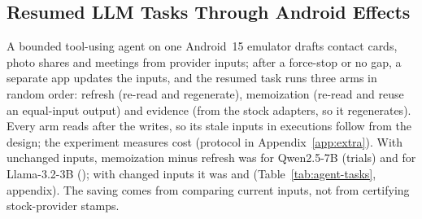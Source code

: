 
\subsection{Resumed LLM Tasks Through Android Effects}
\label{sec:agent-tasks}
A bounded tool-using agent on one Android~15 emulator drafts contact cards, photo shares and meetings from provider inputs; after a force-stop or no gap, a separate app updates the inputs, and the resumed task runs three arms in random order: refresh (re-read and regenerate), memoization (re-read and reuse an equal-input output) and evidence (\Unknown from the stock adapters, so it regenerates). Every arm reads after the writes, so its \TaskStaleK stale inputs in \TaskArmN executions follow from the design; the experiment measures cost (protocol in Appendix~\ref{app:extra}). With unchanged inputs, memoization minus refresh was \TaskPairMemoUnchQwen for Qwen2.5-7B (\TaskPairNUnchQwen trials) and \TaskPairMemoUnchLlama for Llama-3.2-3B (\TaskPairNUnchLlama); with changed inputs it was \TaskPairMemoChgQwen and \TaskPairMemoChgLlama (Table~\ref{tab:agent-tasks}, appendix). The saving comes from comparing current inputs, not from certifying stock-provider stamps.
